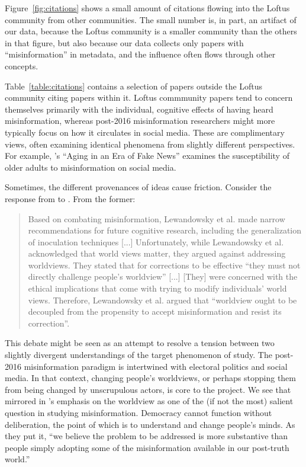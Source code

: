 \documentclass[          
 pre,
 twocolumn,
 twoside,
 superscriptaddress,
 amsmath,
 amssymb,                
 apsf
]{revtex4-2}
\begin{document}
Figure~\ref{fig:citations} shows a small amount of citations flowing into the Loftus community from other communities. The small number is, in part, an artifact of our data, because the Loftus community is a smaller community than the others in that figure, but also because our data collects only papers with ``misinformation'' in metadata, and the influence often flows through other concepts. 

Table~\ref{table:citations} contains a selection of papers outside the Loftus community citing papers within it. Loftus commmunity papers tend to concern themselves primarily with the individual, cognitive effects of having heard misinformation, whereas post-2016 misinformation researchers might more typically focus on how it circulates in social media. These are complimentary views, often examining identical phenomena from slightly different perspectives. For example, \citet{brashierAgingEraFake2020}'s ``Aging in an Era of Fake News'' examines the susceptibility of older adults to misinformation on social media.

Sometimes, the different provenances of ideas cause friction. Consider the response from \citet{hymanMisinformationWorldviewsPosttruth2017} to \citet{lewandowskyMisinformationUnderstandingCoping2017}. From the former:

\begin{quote} 
    Based on combating misinformation, Lewandowsky et al. made narrow recommendations for future cognitive research, including the generalization of inoculation techniques [...] Unfortunately, while Lewandowsky et al. acknowledged that world views matter, they argued against addressing worldviews. They stated that for corrections to be effective “they must not directly challenge people’s worldview” [...] [They] were concerned with the ethical implications that come with trying to modify individuals’ world views. Therefore, Lewandowsky et al. argued that “worldview ought to be decoupled from the propensity to accept misinformation and resist its correction”.
  \end{quote}

This debate might be seen as an attempt to resolve a tension between two slightly divergent understandings of the target phenomenon of study. The post-2016 misinformation paradigm is intertwined with electoral politics and social media. In that context, changing people's worldviews, or perhaps stopping them from being changed by unscrupulous actors, is core to the project. We see that mirrored in \citet{hymanMisinformationWorldviewsPosttruth2017}'s emphasis on the worldview as one of the (if not the most) salient question in studying misinformation. Democracy cannot function without deliberation, the point of which is to understand and change people's minds. As they put it, ``we believe the problem to be addressed is more substantive than people simply adopting some of the misinformation available in our post-truth world.''
\end{document}
